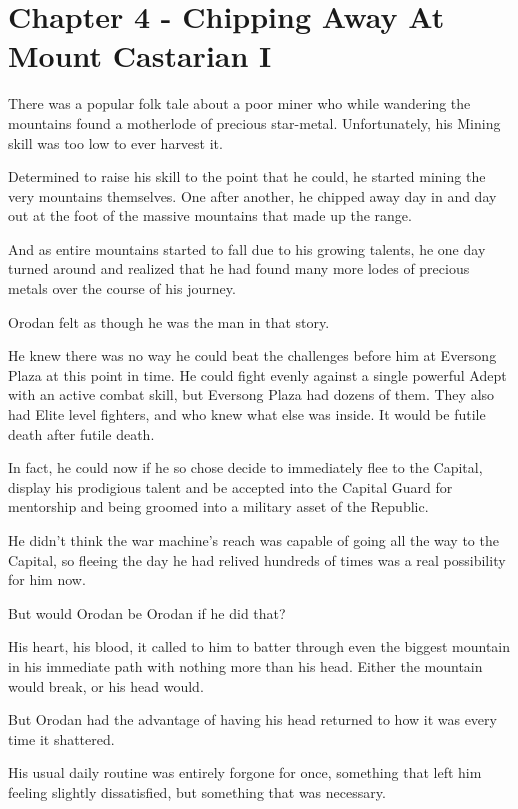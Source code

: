 \documentclass[a4paper,10pt]{book}
\begin{document}
\section*{Chapter 4 - Chipping Away At Mount Castarian I}
%
\par
There was a popular folk tale about a poor miner who while wandering the mountains found a motherlode of precious star-metal. Unfortunately, his Mining skill was too low to ever harvest it.\par
Determined to raise his skill to the point that he could, he started mining the very mountains themselves. One after another, he chipped away day in and day out at the foot of the massive mountains that made up the range.\par
And as entire mountains started to fall due to his growing talents, he one day turned around and realized that he had found many more lodes of precious metals over the course of his journey.\par
Orodan felt as though he was the man in that story.\par
He knew there was no way he could beat the challenges before him at Eversong Plaza at this point in time. He could fight evenly against a single powerful Adept with an active combat skill, but Eversong Plaza had dozens of them. They also had Elite level fighters, and who knew what else was inside. It would be futile death after futile death.\par
In fact, he could now if he so chose decide to immediately flee to the Capital, display his prodigious talent and be accepted into the Capital Guard for mentorship and being groomed into a military asset of the Republic.\par
He didn’t think the war machine’s reach was capable of going all the way to the Capital, so fleeing the day he had relived hundreds of times was a real possibility for him now.\par
But would Orodan be Orodan if he did that?\par
His heart, his blood, it called to him to batter through even the biggest mountain in his immediate path with nothing more than his head. Either the mountain would break, or his head would.\par
But Orodan had the advantage of having his head returned to how it was every time it shattered.\par
His usual daily routine was entirely forgone for once, something that left him feeling slightly dissatisfied, but something that was necessary.\par
\end{document}

